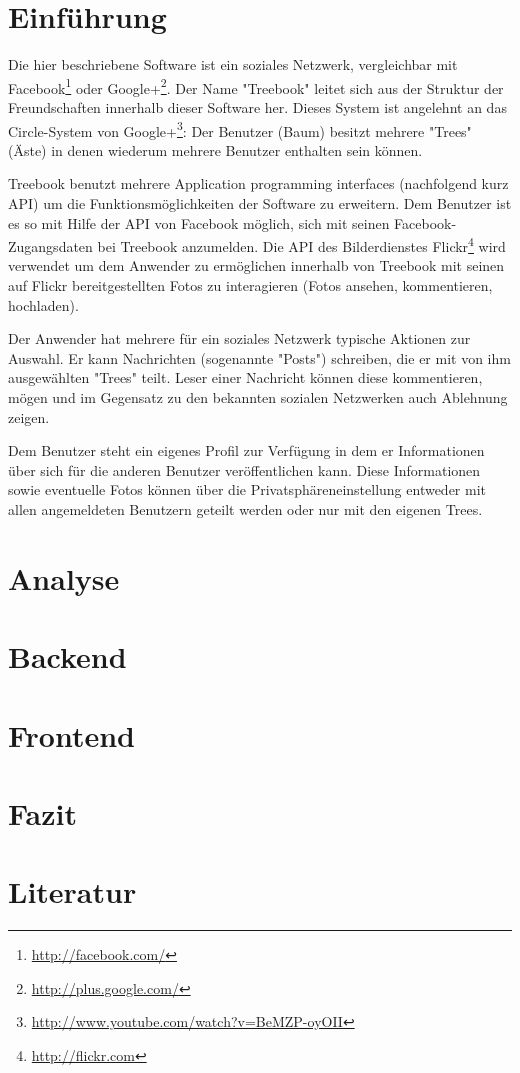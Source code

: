 \documentclass[10pt,a4paper]{book}
\begin{document}
\chapter{Einführung}
Die hier beschriebene Software ist ein soziales Netzwerk, vergleichbar mit Facebook\footnote{\href{http://facebook.com/}{http://facebook.com/}} oder Google+\footnote{\href{http://plus.google.com/}{http://plus.google.com/}}. Der Name "Treebook" leitet sich aus der Struktur der Freundschaften innerhalb dieser Software her. Dieses System ist angelehnt an das Circle-System von Google+\footnote{\href{http://www.youtube.com/watch?v=BeMZP-oyOII}{http://www.youtube.com/watch?v=BeMZP-oyOII}}: Der Benutzer (Baum) besitzt mehrere "Trees" (Äste) in denen wiederum mehrere Benutzer enthalten sein können.

Treebook benutzt mehrere Application programming interfaces (nachfolgend kurz API) um die Funktionsmöglichkeiten der Software zu erweitern. Dem Benutzer ist es so mit Hilfe der API von Facebook möglich, sich mit seinen Facebook-Zugangsdaten bei Treebook anzumelden. Die API des Bilderdienstes Flickr\footnote{\href{http://flickr.com}{http://flickr.com}} wird verwendet um dem Anwender zu ermöglichen innerhalb von Treebook mit seinen auf Flickr bereitgestellten Fotos zu interagieren (Fotos ansehen, kommentieren, hochladen).

Der Anwender hat mehrere für ein soziales Netzwerk typische Aktionen zur Auswahl. Er kann Nachrichten (sogenannte "Posts") schreiben, die er mit von ihm ausgewählten "Trees" teilt. Leser einer Nachricht können diese kommentieren, mögen und im Gegensatz zu den bekannten sozialen Netzwerken auch Ablehnung zeigen.

Dem Benutzer steht ein eigenes Profil zur Verfügung in dem er Informationen über sich für die anderen Benutzer veröffentlichen kann. Diese Informationen sowie eventuelle Fotos können über die Privatsphäreneinstellung entweder mit allen angemeldeten Benutzern geteilt werden oder nur mit den eigenen Trees.
\chapter{Analyse}

\chapter{Backend}

\chapter{Frontend}

\chapter{Fazit}

\chapter{Literatur}
\end{document}
